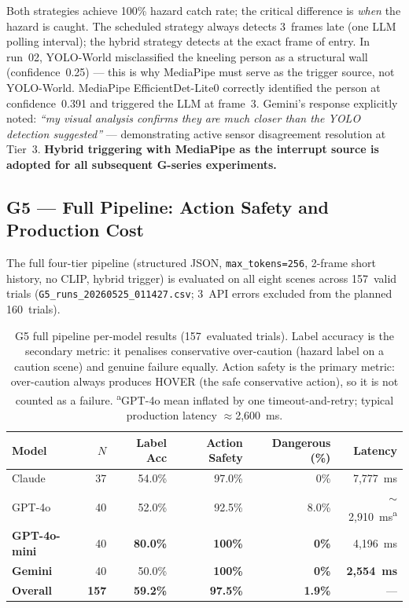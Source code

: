 Both strategies achieve 100\% hazard catch rate; the critical difference is
\emph{when} the hazard is caught. The scheduled strategy always detects 3~frames
late (one LLM polling interval); the hybrid strategy detects at the exact frame
of entry. In run~02, YOLO-World misclassified the kneeling person as a structural
wall (confidence~0.25) --- this is why MediaPipe must serve as the trigger source,
not YOLO-World. MediaPipe EfficientDet-Lite0 correctly identified the person at
confidence~0.391 and triggered the LLM at frame~3. Gemini's response explicitly
noted: \emph{``my visual analysis confirms they are much closer than the YOLO
detection suggested''} --- demonstrating active sensor disagreement resolution at
Tier~3. \textbf{Hybrid triggering with MediaPipe as the interrupt source is
adopted for all subsequent G-series experiments.}

\subsection{G5 --- Full Pipeline: Action Safety and Production Cost}
\label{sec:ch2_g5}

The full four-tier pipeline (structured JSON, \texttt{max\_tokens=256}, 2-frame
short history, no CLIP, hybrid trigger) is evaluated on all eight scenes across
157~valid trials (\texttt{G5\_runs\_20260525\_011427.csv};
3~API errors excluded from the planned 160~trials).

\begin{table}[ht]
  \caption{G5 full pipeline per-model results (157~evaluated trials).
    Label accuracy is the secondary metric: it penalises conservative
    over-caution (hazard label on a caution scene) and genuine failure equally.
    Action safety is the primary metric: over-caution always produces HOVER
    (the safe conservative action), so it is not counted as a failure.
    \textsuperscript{a}GPT-4o mean inflated by one timeout-and-retry; typical
    production latency $\approx$2,600~ms.}
  \label{tab:ch2_g5_models}
  \centering
  \small
  \begin{tabular}{lrrrrr}
    \toprule
    Model & $N$ & Label Acc & Action Safety & Dangerous (\%) & Latency \\
    \midrule
    Claude           & 37 & 54.0\% & 97.0\%         & 0\%   & 7,777~ms \\
    GPT-4o           & 40 & 52.0\% & 92.5\%         & 8.0\% & $\sim$2,910~ms\textsuperscript{a} \\
    \textbf{GPT-4o-mini} & 40 & \textbf{80.0\%} & \textbf{100\%} & \textbf{0\%} & 4,196~ms \\
    \textbf{Gemini}  & 40 & 50.0\% & \textbf{100\%} & \textbf{0\%} & \textbf{2,554~ms} \\
    \midrule
    \textbf{Overall} & \textbf{157} & \textbf{59.2\%} & \textbf{97.5\%} & \textbf{1.9\%} & --- \\
    \bottomrule
  \end{tabular}
\end{table}

